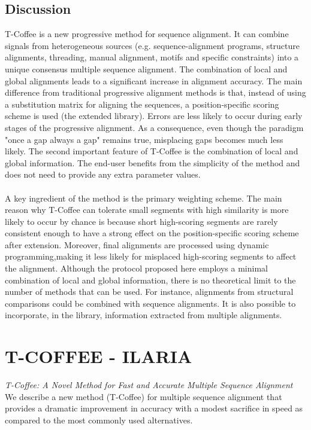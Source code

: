 \section{Discussion}
T-Coffee is a new progressive method for sequence alignment. It can combine signals from heterogeneous sources (e.g. sequence-alignment programs, structure alignments, threading, manual alignment, motifs and specific constraints) into a unique consensus multiple sequence alignment.
The combination of local and global alignments leads to a significant increase in alignment accuracy.
The main difference from traditional progressive alignment methods is that, instead of using a substitution matrix for aligning the sequences, a position-specific scoring scheme is used (the extended library). Errors are less likely to occur during early stages of the progressive alignment. As a consequence, even though the paradigm "once a gap always a gap" remains true, misplacing gaps becomes much less likely.
The second important feature of T-Coffee is the combination of local and global information. The end-user benefits from the simplicity of the method and does not need to provide any extra parameter values.
\\
\\
\noindent
A key ingredient of the method is the primary weighting scheme.  The main reason why T-Coffee can tolerate small segments with high similarity is more likely to occur by chance is because short high-scoring segments are rarely consistent enough to have a strong effect on the position-specific scoring scheme after extension.
Moreover, final alignments are processed using dynamic programming,making it less likely for misplaced high-scoring segments to affect the alignment.
Although the protocol proposed here employs a minimal combination of local and global information, there is no theoretical limit to the number of methods that can be used. For instance, alignments from structural comparisons could be combined with sequence alignments. It is also possible to incorporate, in the library, information extracted from multiple alignments.


\chapter{T-COFFEE - ILARIA}
\emph{T-Coffee: A Novel Method for Fast and Accurate Multiple Sequence Alignment}
We describe a new method (T-Coffee) for multiple sequence alignment that provides a dramatic improvement in accuracy with a modest sacrifice in speed as compared to the most commonly used alternatives.
